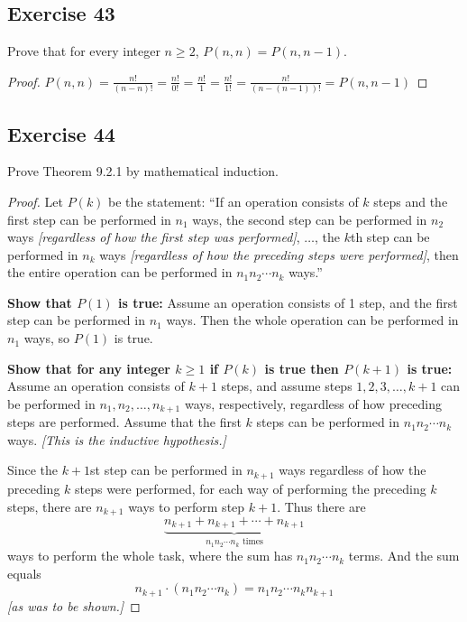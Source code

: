\documentclass[14pt]{extarticle}
\newcommand{\dps}{\displaystyle}
\begin{document}
\subsection{Exercise 43}
Prove that for every integer \(n \geq 2\), \(P(n, n) = P(n, n - 1)\).

\begin{proof}
\(P(n,n)= \dps\frac{n!}{(n-n)!} = \frac{n!}{0!} = \frac{n!}{1} = \frac{n!}{1!} = \frac{n!}{(n-(n-1))!} = P(n,n-1)\)
\end{proof}

\subsection{Exercise 44}
Prove Theorem 9.2.1 by mathematical induction.

\begin{proof}
Let \(P(k)\) be the statement: ``If an operation consists of $k$ steps and the first step can be performed in $n_1$ 
ways, the second step can be performed in $n_2$ ways {\it [regardless of how the first step was performed]}, 
\(\ldots\), the $k$th step can be performed in $n_k$ ways {\it [regardless of how the preceding steps were 
performed]}, then the entire operation can be performed in \(n_1n_2 \cdots n_k\) ways.''

{\bf Show that \(P(1)\) is true:} Assume an operation consists of 1 step, and the first step can be performed in
\(n_1\) ways. Then the whole operation can be performed in \(n_1\) ways, so \(P(1)\) is true.

{\bf Show that for any integer \(k \geq 1\) if \(P(k)\) is true then \(P(k+1)\) is true:} Assume an operation consists
of $k+1$ steps, and assume steps \(1, 2, 3, \ldots, k+1\) can be performed in \(n_1, n_2, \ldots, n_{k+1}\) ways,
respectively, regardless of how preceding steps are performed. Assume that the first $k$ steps can be performed 
in \(n_1n_2 \cdots n_k\) ways. {\it [This is the inductive hypothesis.]}

Since the $k+1$st step can be performed in \(n_{k+1}\) ways regardless of how the preceding $k$ steps were performed, 
for each way of performing the preceding $k$ steps, there are \(n_{k+1}\) ways to perform step $k+1$. Thus there are
\[
\underbrace{n_{k+1} + n_{k+1} + \cdots + n_{k+1}}_{n_1n_2 \cdots n_k \text{ times}}
\]
ways to perform the whole task, where the sum has \(n_1n_2 \cdots n_k\) terms. And the sum equals
\[
n_{k+1} \cdot (n_1n_2 \cdots n_k) = n_1n_2 \cdots n_k n_{k+1}
\]
{\it [as was to be shown.]}
\end{proof}
\end{document}
